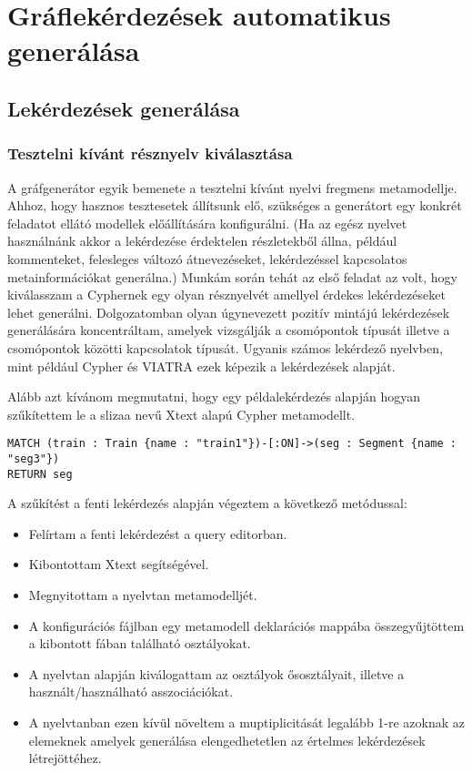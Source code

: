 \chapter{Gráflekérdezések automatikus generálása}
\section{Lekérdezések generálása}

\subsection{Tesztelni kívánt résznyelv kiválasztása}

A gráfgenerátor egyik bemenete a tesztelni kívánt nyelvi fregmens metamodellje. Ahhoz, hogy hasznos tesztesetek állítsunk elő, szükséges a generátort egy konkrét feladatot ellátó modellek előállítására konfigurálni. (Ha az egész nyelvet használnánk akkor a lekérdezése érdektelen részletekből állna, például kommenteket, felesleges változó átnevezéseket, lekérdezéssel kapcsolatos metainformációkat generálna.) Munkám során tehát az első feladat az volt, hogy kiválasszam a Cyphernek egy olyan résznyelvét amellyel érdekes lekérdezéseket lehet generálni. Dolgozatomban olyan úgynevezett pozitív mintájú lekérdezések generálására koncentráltam, amelyek vizsgálják a csomópontok típusát illetve a csomópontok közötti kapcsolatok típusát. Ugyanis számos lekérdező nyelvben, mint például Cypher\cite{Cypher} és \textsc{VIATRA} \cite{viatra} ezek képezik a lekérdezések alapját. 
 
Alább azt kívánom megmutatni, hogy egy példalekérdezés alapján hogyan szűkítettem le a slizaa \cite{slizaa_2018} nevű Xtext alapú Cypher metamodellt. 

\begin{lstlisting}[style=cyphersmall]
MATCH (train : Train {name : "train1"})-[:ON]->(seg : Segment {name : "seg3"}) 
RETURN seg
\end{lstlisting}

A szűkítést a fenti lekérdezés alapján végeztem a következő metódussal:
\begin{itemize}
	\item Felírtam a fenti lekérdezést a query editorban.
	\item Kibontottam Xtext segítségével.
	\item Megnyitottam a nyelvtan metamodelljét.
	\item A konfigurációs fájlban egy metamodell deklarációs mappába összegyűjtöttem a kibontott fában található osztályokat.
	\item A nyelvtan alapján kiválogattam az osztályok ősosztályait, illetve a használt/használható asszociációkat.
	\item A nyelvtanban ezen kívül növeltem a muptiplicitását legalább 1-re azoknak az elemeknek amelyek generálása elengedhetetlen az értelmes lekérdezések létrejöttéhez.
 	
\end{itemize}   


